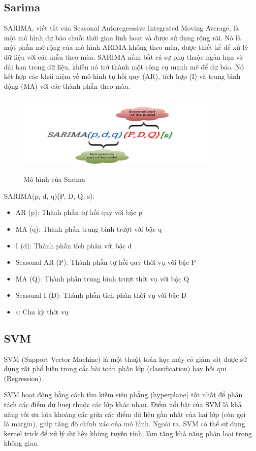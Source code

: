 \documentclass[conference]{IEEEtran}
\begin{document}
\subsection{\textbf{Sarima}}
SARIMA, viết tắt của Seasonal Autoregressive Integrated Moving Average, là một mô hình dự báo chuỗi thời gian linh hoạt và được sử dụng rộng rãi. Nó là một phần mở rộng của mô hình ARIMA không theo mùa, được thiết kế để xử lý dữ liệu với các mẫu theo mùa. SARIMA nắm bắt cả sự phụ thuộc ngắn hạn và dài hạn trong dữ liệu, khiến nó trở thành một công cụ mạnh mẽ để dự báo. Nó kết hợp các khái niệm về mô hình tự hồi quy (AR), tích hợp (I) và trung bình động (MA) với các thành phần theo mùa.
\begin{figure}[H]
    \centering
    \includegraphics[width= 10cm, height= 4cm]{Images/sarima.png}
    \caption{Mô hình của Sarima}
\end{figure}
SARIMA(p, d, q)(P, D, Q, s):
\begin{itemize}
    \item AR (p): Thành phần tự hồi quy với bậc p
    \item MA (q): Thành phần trung bình trượt với bậc q
    \item I (d): Thành phần tích phân với bậc d
    \item Seasonal AR (P): Thành phần tự hồi quy thời vụ với bậc P
    \item MA (Q): Thành phần trung bình trượt thời vụ với bậc Q
    \item Seasonal I (D): Thành phần tích phân thời vụ với bậc D
    \item s: Chu kỳ thời vụ
\end{itemize}

\subsection{SVM}
SVM (Support Vector Machine) là một thuật toán học máy có giám sát được sử dụng rất phổ biến trong các bài toán phấn lớp (classification) hay hồi qui (Regression).

 SVM hoạt động bằng cách tìm kiếm siêu phẳng (hyperplane) tốt nhất để phân tách các điểm dữ liuej thuộc các lớp khác nhau. Điểm nổi bật của SVM là khả năng tối ưu hóa khoảng các giữa các điểm dữ liệu gần nhất của hai lớp (còn gọi là margin), giúp tăng độ chính xác  của mô hình. Ngoài ra, SVM có thể sử dụng kernel trick để xử lý dữ liệu không tuyến tính, làm tăng khả năng phân loại trong không gian.
 
\end{document}
